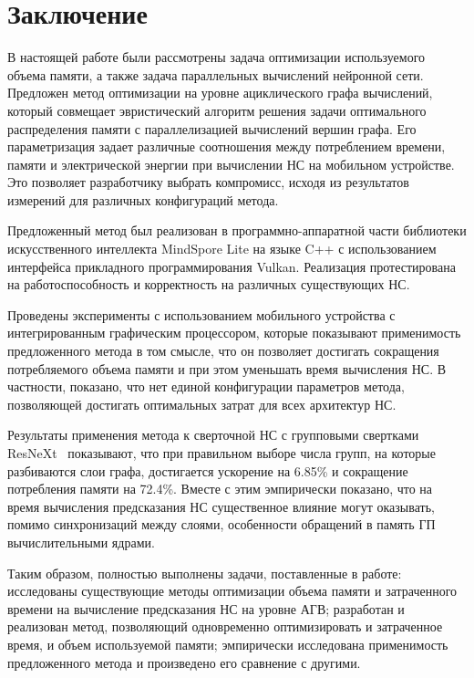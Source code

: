 
\section{Заключение}

В настоящей работе были рассмотрены задача оптимизации используемого объема
памяти, а также задача параллельных вычислений нейронной сети. Предложен метод
оптимизации на уровне ациклического графа вычислений, который совмещает
эвристический алгоритм решения задачи оптимального распределения памяти с
параллелизацией вычислений вершин графа. Его параметризация задает различные
соотношения между потреблением времени, памяти и электрической энергии при
вычислении НС на мобильном устройстве. Это позволяет разработчику выбрать
компромисс, исходя из результатов измерений для различных конфигураций метода.

Предложенный метод был реализован в программно-аппаратной части библиотеки
искусственного интеллекта MindSpore Lite на языке C++ с использованием
интерфейса прикладного программирования Vulkan. Реализация протестирована на
работоспособность и корректность на различных существующих НС.

Проведены эксперименты с использованием мобильного устройства с интегрированным
графическим процессором, которые показывают применимость предложенного метода в
том смысле, что он позволяет достигать сокращения потребляемого объема памяти и
при этом уменьшать время вычисления НС. В частности, показано, что нет единой
конфигурации параметров метода, позволяющей достигать оптимальных затрат для
всех архитектур НС.

Результаты применения метода к сверточной НС с групповыми свертками
ResNeXt~\cite{resnext} показывают, что при правильном выборе числа групп, на
которые разбиваются слои графа, достигается ускорение на 6.85\% и сокращение
потребления памяти на 72.4\%. Вместе с этим эмпирически показано, что на время
вычисления предсказания НС существенное влияние могут оказывать, помимо
синхронизаций между слоями, особенности обращений в память ГП вычислительными
ядрами.

Таким образом, полностью выполнены задачи, поставленные в работе: исследованы
существующие методы оптимизации объема памяти и затраченного времени на
вычисление предсказания НС на уровне АГВ; разработан и реализован метод,
позволяющий одновременно оптимизировать и затраченное время, и объем
используемой памяти; эмпирически исследована применимость предложенного метода и
произведено его сравнение с другими.
